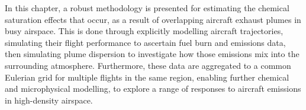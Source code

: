 In this chapter, a robust methodology is presented for estimating the chemical saturation effects that occur, as a result of overlapping aircraft exhaust plumes in busy airspace. This is done through explicitly modelling aircraft trajectories, simulating their flight performance to ascertain fuel burn and emissions data, then simulating plume dispersion to investigate how those emissions mix into the surrounding atmosphere. Furthermore, these data are aggregated to a common Eulerian grid for multiple flights in the same region, enabling further chemical and microphysical modelling, to explore a range of responses to aircraft emissions in high-density airspace.













% 

% 
